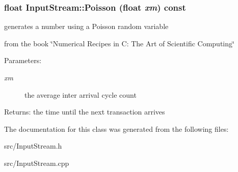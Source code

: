 \subsubsection[{Poisson}]{\setlength{\rightskip}{0pt plus 5cm}float InputStream::Poisson (float {\em xm}) const}\label{class_d_r_a_msim_i_i_1_1_input_stream_dd6af3d1e6c21f1a5d847d55f4a7e82a}


generates a number using a Poisson random variable 

from the book \char`\"{}Numerical Recipes in C: The Art of Scientific Computing\char`\"{} \begin{Desc}
\item[Parameters:]
\begin{description}
\item[{\em xm}]the average inter arrival cycle count \end{description}
\end{Desc}
\begin{Desc}
\item[Returns:]the time until the next transaction arrives \end{Desc}


The documentation for this class was generated from the following files:\begin{CompactItemize}
\item 
src/InputStream.h\item 
src/InputStream.cpp\end{CompactItemize}

